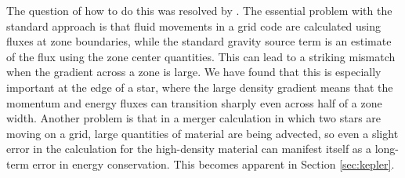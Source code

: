 \documentclass[iop]{emulateapj}
\begin{document}
The question of how to do this was resolved by \cite{arepo}. 
The essential problem with the standard approach is that 
fluid movements in a grid code are calculated using
fluxes at zone boundaries, while the standard gravity source term is
an estimate of the flux using the zone center quantities. This can
lead to a striking mismatch when the gradient across a zone is
large. We have found that this is especially important at the edge of
a star, where the large density gradient means that the momentum and
energy fluxes can transition sharply even across half of a zone
width. Another problem is that in a merger calculation in which two
stars are moving on a grid, large quantities of material are being
advected, so even a slight error in the calculation for the
high-density material can manifest itself as a long-term error in
energy conservation. This becomes apparent in Section
\ref{sec:kepler}. 
\end{document}
